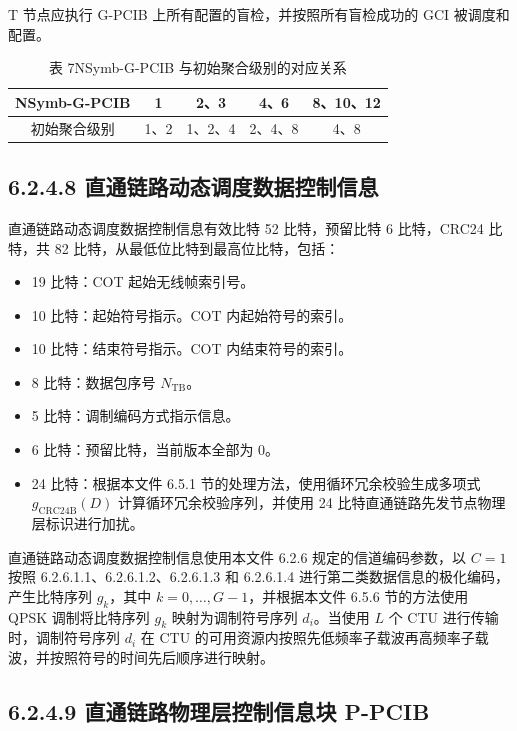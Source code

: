 \documentclass[11pt,a4paper]{ctexart}
\begin{document}
T 节点应执行 G-PCIB 上所有配置的盲检，并按照所有盲检成功的 GCI 被调度和配置。

\begin{table}[h]
\centering
\caption{表 7\quad NSymb-G-PCIB 与初始聚合级别的对应关系}
\begin{tabular}{ccccc}
\toprule
NSymb-G-PCIB & 1 & 2、3 & 4、6 & 8、10、12 \\
\midrule
初始聚合级别 & 1、2 & 1、2、4 & 2、4、8 & 4、8 \\
\bottomrule
\end{tabular}
\end{table}

\subsection{6.2.4.8 直通链路动态调度数据控制信息}

直通链路动态调度数据控制信息有效比特 52 比特，预留比特 6 比特，CRC24 比特，共 82 比特，从最低位比特到最高位比特，包括：
\begin{itemize}[nosep]
  \item 19 比特：COT 起始无线帧索引号。
  \item 10 比特：起始符号指示。COT 内起始符号的索引。
  \item 10 比特：结束符号指示。COT 内结束符号的索引。
  \item 8 比特：数据包序号 $N_{\mathrm{TB}}$。
  \item 5 比特：调制编码方式指示信息。
  \item 6 比特：预留比特，当前版本全部为 0。
  \item 24 比特：根据本文件 6.5.1 节的处理方法，使用循环冗余校验生成多项式 $g_{\mathrm{CRC24B}}(D)$ 计算循环冗余校验序列，并使用 24 比特直通链路先发节点物理层标识进行加扰。
\end{itemize}

直通链路动态调度数据控制信息使用本文件 6.2.6 规定的信道编码参数，以 $C = 1$ 按照 6.2.6.1.1、6.2.6.1.2、6.2.6.1.3 和 6.2.6.1.4 进行第二类数据信息的极化编码，产生比特序列 $g_k$，其中 $k = 0, \ldots, G-1$，并根据本文件 6.5.6 节的方法使用 QPSK 调制将比特序列 $g_k$ 映射为调制符号序列 $d_i$。当使用 $L$ 个 CTU 进行传输时，调制符号序列 $d_i$ 在 CTU 的可用资源内按照先低频率子载波再高频率子载波，并按照符号的时间先后顺序进行映射。

\subsection{6.2.4.9 直通链路物理层控制信息块 P-PCIB}
\end{document}
